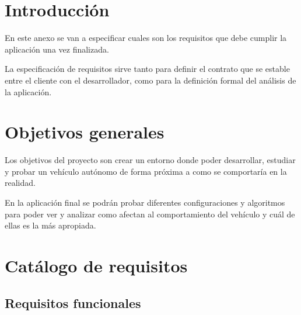 
\section{Introducción}
En este anexo se van a especificar cuales son los requisitos que debe cumplir la aplicación una vez finalizada.

La especificación de requisitos sirve tanto para definir el contrato que se estable entre el cliente con el desarrollador, como para la definición formal del análisis de la aplicación.

\section{Objetivos generales}
Los objetivos del proyecto son crear un entorno donde poder desarrollar, estudiar y probar un vehículo autónomo de forma próxima a como se comportaría en la realidad.

En la aplicación final se podrán probar diferentes configuraciones y algoritmos para poder ver y analizar como afectan al comportamiento del vehículo y cuál de ellas es la más apropiada.

\section{Catálogo de requisitos}

\subsection{Requisitos funcionales}

